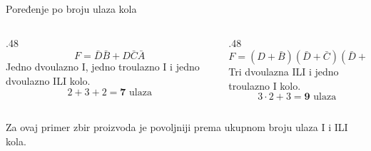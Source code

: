 \begin{frame}[label=02-s045]{Poređenje po broju ulaza kola}
\setlength{\parskip}{0pt}
\begin{columns}[T,onlytextwidth]
\begin{column}{.48\textwidth}
\[F=\bar D\bar B+D\bar C\bar A\]
Jedno dvoulazno I, jedno troulazno I i jedno dvoulazno ILI kolo.
\[2+3+2=\mathbf{7}\text{ ulaza}\]
\end{column}
\begin{column}{.48\textwidth}
\[F=(D+\bar B)(\bar D+\bar C)(\bar D+\bar A)\]
Tri dvoulazna ILI i jedno troulazno I kolo.
\[3\cdot2+3=\mathbf{9}\text{ ulaza}\]
\end{column}
\end{columns}
\par\vspace{3mm}
Za ovaj primer zbir proizvoda je povoljniji prema ukupnom broju ulaza I i ILI kola.
\par\vspace{2mm}
\end{frame}
